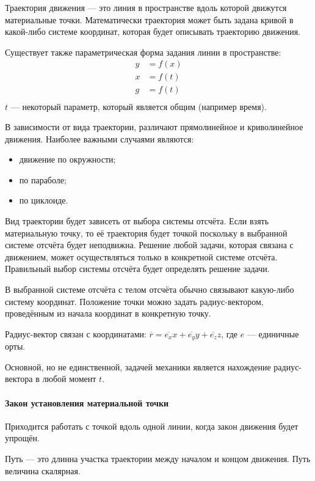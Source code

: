 \documentclass[10pt]{scrbook}
\begin{document}
Траектория движения --- это линия в пространстве вдоль которой движутся
материальные точки. Математически траектория может быть задана кривой в
какой-либо системе координат, которая будет описывать траекторию движения.

Существует также параметрическая форма задания линии в пространстве:
\begin{align*}
	y & = f(x) \\
	x & = f(t) \\
	g & = f(t) \\
\end{align*}
\( t \) --- некоторый параметр, который является общим (например время).

В зависимости от вида траектории, различают прямолинейное и криволинейное
движения. Наиболее важными случаями являются:
\begin{itemize}
	\item движение по окружности;
	\item по параболе;
	\item по циклоиде.
\end{itemize}

Вид траектории будет зависеть от выбора системы отсчёта. Если взять
материальную точку, то её траектория будет точкой поскольку в выбранной системе
отсчёта будет неподвижна. Решение любой задачи, которая связана с движением,
может осуществляться только в конкретной системе отсчёта. Правильный выбор
системы отсчёта будет определять решение задачи.

В выбранной системе отсчёта с телом отсчёта обычно связывают какую-либо
систему координат. Положение точки можно задать радиус-вектором,
проведённым из начала координат в конкретную точку.

Радиус-вектор связан с координатами: \( \overline{r} = \overline{e_x} x
+ \overline{e_y} y + \overline{e_z} z \), где $e$ --- единичные орты.

Основной, но не единственной, задачей механики является нахождение
радиус-вектора в любой момент $t$.

\paragraph{Закон установления материальной точки}
Приходится работать с точкой вдоль одной линии, когда закон движения будет
упрощён.

Путь --- это длинна участка траектории между началом и концом движения. Путь
величина скалярная.
\end{document}
